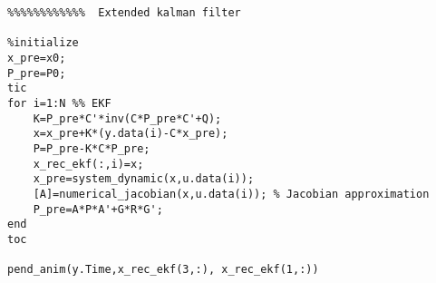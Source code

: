 \documentclass[letterpaper]{article}
\begin{document}
\begin{enumerate}
\begin{verbatim}
%%%%%%%%%%%%  Extended kalman filter

%initialize
x_pre=x0;
P_pre=P0;
tic
for i=1:N %% EKF
    K=P_pre*C'*inv(C*P_pre*C'+Q);
    x=x_pre+K*(y.data(i)-C*x_pre);
    P=P_pre-K*C*P_pre;
    x_rec_ekf(:,i)=x;
    x_pre=system_dynamic(x,u.data(i));
    [A]=numerical_jacobian(x,u.data(i)); % Jacobian approximation
    P_pre=A*P*A'+G*R*G';
end
toc

pend_anim(y.Time,x_rec_ekf(3,:), x_rec_ekf(1,:))

\end{verbatim}



\end{enumerate}
\end{document}
